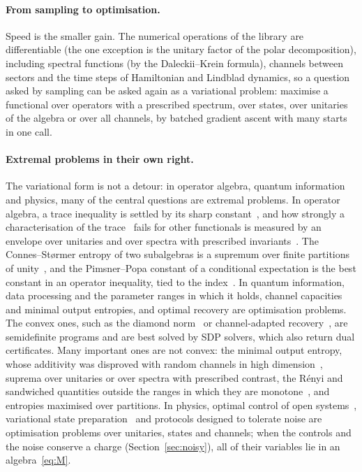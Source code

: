 \documentclass[11pt]{article}
\begin{document}
\paragraph{From sampling to optimisation.} Speed is the smaller gain. The numerical operations of the library are
differentiable (the one exception is the unitary factor of the polar decomposition), including spectral functions (by the Daleckii--Krein formula), channels between sectors and the time
steps of Hamiltonian and Lindblad dynamics, so a question asked by sampling can be asked again as a variational
problem: maximise a functional over operators with a prescribed spectrum, over states, over unitaries of the algebra or
over all channels, by batched gradient ascent with many starts in one call.

\paragraph{Extremal problems in their own right.} The variational form is not a detour: in operator algebra, quantum information and
physics, many of the central questions are extremal problems. In operator algebra, a trace inequality is settled by its
sharp constant~\cite{carlen2010}, and how strongly a characterisation of the trace~\cite{gardner1979,petz1988} fails
for other functionals is measured by an envelope over unitaries and over spectra with prescribed
invariants~\cite{abed2024,nn_trace}. The Connes--Størmer entropy
of two subalgebras is a supremum over finite partitions of unity~\cite{connes1975,pimsner1986}, and the
Pimsner--Popa constant of a conditional expectation is the best constant in an operator inequality, tied to the
index~\cite{pimsner1986,frank1998}. In quantum information, data processing and the parameter ranges in which it
holds, channel capacities and minimal output entropies, and optimal recovery are optimisation problems. The convex
ones, such as the diamond norm~\cite{watrous2009} or channel-adapted recovery~\cite{fletcher2007}, are semidefinite
programs and are best solved by SDP solvers, which also return dual certificates. Many important ones are not
convex: the minimal output entropy, whose additivity was disproved with random channels in
high dimension~\cite{hastings2009}, suprema over unitaries or over spectra with prescribed contrast, the Rényi and
sandwiched quantities outside the ranges in which they are monotone~\cite{mullerlennert2013,berta2017}, and entropies
maximised over partitions. In physics, optimal control of open systems~\cite{khaneja2005,koch2016}, variational state
preparation~\cite{cerezo2021} and protocols designed to tolerate noise are optimisation problems over unitaries, states
and channels; when the controls and the noise conserve a charge (Section~\ref{sec:noisy}), all of their variables lie
in an algebra~\eqref{eq:M}.
\end{document}
